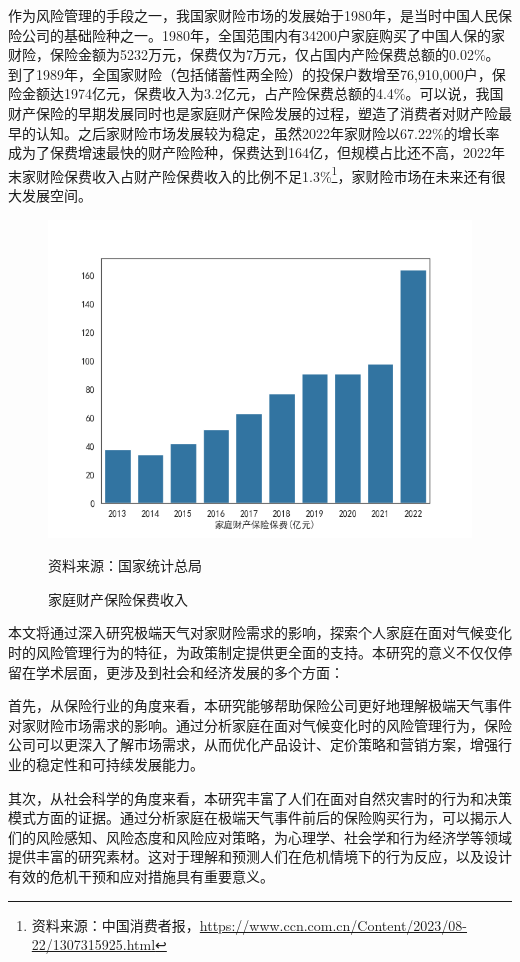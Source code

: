 作为风险管理的手段之一，我国家财险市场的发展始于1980年，是当时中国人民保险公司的基础险种之一。1980年，全国范围内有34200户家庭购买了中国人保的家财险，保险金额为5232万元，保费仅为7万元，仅占国内产险保费总额的0.02\%。到了1989年，全国家财险（包括储蓄性两全险）的投保户数增至76,910,000户，保险金额达1974亿元，保费收入为3.2亿元，占产险保费总额的4.4\%。可以说，我国财产保险的早期发展同时也是家庭财产保险发展的过程\citep{黄英君2008论我国产险公司分散性业务营销模式的创新}，塑造了消费者对财产险最早的认知。之后家财险市场发展较为稳定，虽然2022年家财险以67.22\%的增长率成为了保费增速最快的财产险险种，保费达到164亿，但规模占比还不高，2022年末家财险保费收入占财产险保费收入的比例不足1.3\%\footnote{资料来源：中国消费者报，\url{https://www.ccn.com.cn/Content/2023/08-22/1307315925.html}}，家财险市场在未来还有很大发展空间。
\begin{figure}[htbp]
    {\centering
    \includegraphics[width=0.8\linewidth]{img/家庭财产保险保费.png}\par }
    \caption{家庭财产保险保费收入}
    资料来源：国家统计总局\protect\footnotemark
\end{figure}

本文将通过深入研究极端天气对家财险需求的影响，探索个人家庭在面对气候变化时的风险管理行为的特征，为政策制定提供更全面的支持。本研究的意义不仅仅停留在学术层面，更涉及到社会和经济发展的多个方面：

首先，从保险行业的角度来看，本研究能够帮助保险公司更好地理解极端天气事件对家财险市场需求的影响。通过分析家庭在面对气候变化时的风险管理行为，保险公司可以更深入了解市场需求，从而优化产品设计、定价策略和营销方案，增强行业的稳定性和可持续发展能力。

其次，从社会科学的角度来看，本研究丰富了人们在面对自然灾害时的行为和决策模式方面的证据。通过分析家庭在极端天气事件前后的保险购买行为，可以揭示人们的风险感知、风险态度和风险应对策略，为心理学、社会学和行为经济学等领域提供丰富的研究素材。这对于理解和预测人们在危机情境下的行为反应，以及设计有效的危机干预和应对措施具有重要意义。

